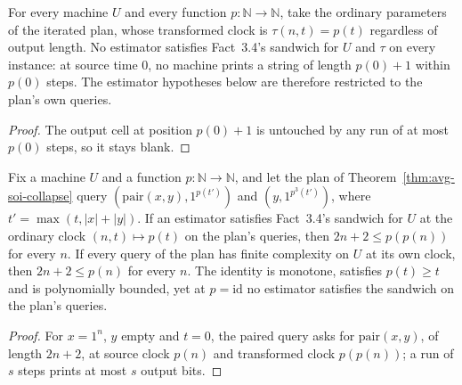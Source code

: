 \begin{lemma}
  \label{lem:avg-no-full-estimator}
  \leanok
  For every machine $U$ and every function $p \colon \mathbb{N} \to
  \mathbb{N}$, take the ordinary parameters of the iterated plan, whose
  transformed clock is $\tau(n, t) = p(t)$ regardless of output length. No
  estimator satisfies Fact~3.4's sandwich for $U$ and $\tau$ on every instance:
  at source time $0$, no machine prints a string of length $p(0) + 1$ within
  $p(0)$ steps. The estimator hypotheses below are therefore restricted to the
  plan's own queries.
\end{lemma}
\begin{proof}
  \leanok
  The output cell at position $p(0) + 1$ is untouched by any run of at most
  $p(0)$ steps, so it stays blank.
\end{proof}

\begin{lemma}
  \label{lem:avg-slow-clock-estimator}
  \leanok
  Fix a machine $U$ and a function $p \colon \mathbb{N} \to \mathbb{N}$, and
  let the plan of Theorem~\ref{thm:avg-soi-collapse} query
  $(\mathrm{pair}(x,y), 1^{p(t')})$ and $(y, 1^{p^3(t')})$, where $t' =
  \max(t, |x|+|y|)$. If an estimator satisfies Fact~3.4's sandwich for $U$ at
  the ordinary clock $(n, t) \mapsto p(t)$ on the plan's queries, then $2n + 2
  \le p(p(n))$ for every $n$. If every query of the plan has finite complexity
  on $U$ at its own clock, then $2n + 2 \le p(n)$ for every $n$. The identity
  is monotone, satisfies $p(t) \ge t$ and is polynomially bounded, yet at $p =
  \mathrm{id}$ no estimator satisfies the sandwich on the plan's queries.
\end{lemma}
\begin{proof}
  \leanok
  For $x = 1^n$, $y$ empty and $t = 0$, the paired query asks for
  $\mathrm{pair}(x, y)$, of length $2n + 2$, at source clock $p(n)$ and
  transformed clock $p(p(n))$; a run of $s$ steps prints at most $s$ output
  bits.
\end{proof}

